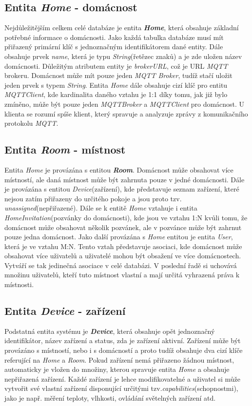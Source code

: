 \subsection*{Entita \emph{Home} - domácnost}
\label{databaze:home}
Nejdůležitějším celkem celé databáze je entita \textbf{\emph{Home}}, která obsahuje základní potřebné informace o domácnosti. Jako každá tabulka databáze musí mít přiřazený primární klíč s jednoznačným identifikátorem dané entity.
Dále obsahuje prvek \emph{name}, která je typu \emph{String}(řetězec znaků) a je zde uložen název domácnosti. Důležitým atributem entity je \emph{brokerURL}, což je URL \emph{MQTT} brokeru. Domácnost může mít pouze jeden \emph{MQTT Broker}, tudíž stačí uložit jeden prvek s typem \emph{String}.
Entita \emph{Home} dále obsahuje cizí klíč pro entitu \emph{MQTTClient}, kde kardinalita daného vztahu je 1:1 díky tomu, jak již bylo zmíněno, může být pouze jeden \emph{MQTTBroker} a \emph{MQTTClient} pro domácnost.
U klienta se rozumí spíše klient, který spravuje a analyzuje zprávy z komunikačního protokolu \emph{MQTT}.

\subsection*{Entita \emph{Room} - místnost}
\label{databaze:room}
Entita \emph{Home} je provázána s entitou \textbf{\emph{Room}}. Domácnost může obsahovat více místností, ale daná místnost může být zahrnuta pouze v jedné domácnosti. Dále je provázána s entitou \emph{Device}(zařízení), kde představuje seznam zařízení, které nejsou zatím přiřazeny do určitého pokoje a jsou proto tzv. \emph{unassigned}(nepřiřazené).
Dále se k entitě \emph{Home} vztahuje i entita \emph{HomeInvitation}(pozvánky do domácnosti), kde jsou ve vztahu 1:N kvůli tomu, že domácnost může obsahovat několik pozvánek, ale v pozvánce může být zahrnut pouze jedna domácnost.
Jako další provázána s \emph{Home} entitou je entita \emph{User}, která je ve vztahu M:N. Tento vztah představuje asociaci, kde domácnost může obsahovat více uživatelů a uživatelé mohou být obsažení ve více domácnostech.
Vytváří se tak jedinečná asociace v celé databázi. V poslední řadě si uchovává množinu uživatelů, kteří tuto místnost vlastní a mají určitá vyhrazená práva k místnosti.

\subsection*{Entita \emph{Device} - zařízení}
\label{databaze:device}
Podstatná entita systému je \textbf{\emph{Device}}, která obsahuje opět jednoznačný identifikátor, název zařízení a status, zda je zařízení aktivní.
Zařízení může být provázáno s místností, nebo i s domácností a proto tudíž obsahuje dva cizí klíče referující na \emph{Home} a \emph{Room}.
Pokud zařízení nemá přiřazeno žádnou místnost, automaticky je vložen do množiny, kterou spravuje entita \emph{Home} a obsahuje nepřiřazená zařízení.
Každé zařízení je lehce modifikovatelné a uživatel si může vytvořit své vlastní zařízení disponující určitými tzv.\emph{capabilities}(schopnostmi), jako je např. měření teploty, vlhkosti, ovládání světelných zařízení atd.

